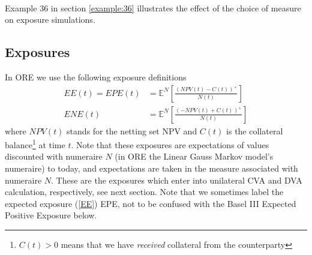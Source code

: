 \documentclass[12pt, a4paper]{article}
\newcommand\E{\ensuremath{\mathbb{E}}}
\newcommand{\NPV}{\mathit{NPV}}
\newcommand{\EE}{\mathit{EE}}
\newcommand{\EPE}{\mathit{EPE}}
\newcommand{\ENE}{\mathit{ENE}}
\begin{document}
{{\begin{appendix}
\begin{align*}
\end{align*}

Example 36 in section \ref{example:36} illustrates the effect of the choice of measure on exposure simulations.

\subsection{Exposures}\label{sec:app_exposure}

In ORE we use the following exposure definitions
\begin{align}
\EE(t) = \EPE(t) &= \E^N\left[ \frac{(NPV(t)-C(t))^+}{N(t)} \right] \label{EE}\\
\ENE(t) &= \E^N\left[ \frac{(-NPV(t)+C(t))^+}{N(t)} \right] \label{ENE}
\end{align}
where $\NPV(t)$ stands for the netting set NPV and $C(t)$ is the collateral balance\footnote{$C(t)>0$ means that we have
  {\em received} collateral from the counterparty} at time $t$. Note that these exposures are expectations of values
discounted with numeraire $N$ (in ORE the Linear Gauss Markov model's numeraire) to today, and expectations are taken in
the measure associated with numeraire $N$. These are the exposures which enter into unilateral CVA and DVA calculation,
respectively, see next section. Note that we sometimes label the expected exposure (\ref{EE}) EPE, not to be confused
with the Basel III Expected Positive Exposure below.


\end{appendix}}}
\end{document}
